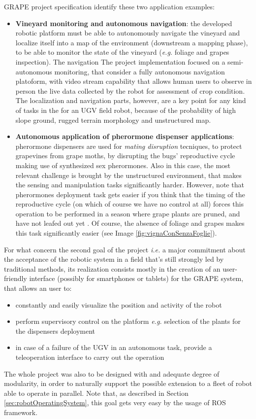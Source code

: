 \ac{GRAPE} project specification identify these two application examples:
\begin{itemize}
	\item \textbf{Vineyard monitoring and autonomous navigation}: the developed robotic platform must be able to autonomously navigate the vineyard and localize itself into a map of the environment (downstream a mapping phase), to be able to monitor the state of the vineyard (\textit{e.g.} foliage and grapes inspection). The navigation The project implementation focused on a semi-autonomous monitoring, that consider a fully autonomous navigation platoform, with video stream capability that allows human users to observe in person the live data collected by the robot for assessment of crop condition. The localization and navigation parts, however, are a key point for any kind of tasks in the for an \ac{UGV} field robot, because of the probability of high slope ground, rugged terrain morphology and unstructured map. 
	\item \textbf{Autonomous application of pherormone dispenser applications}: pherormone dispensers are used for \textit{mating disruption} tecniques, to protect grapevines from grape moths, by disrupting the bugs' reproductive cycle making use of synthesized sex pherormones. Also in this case, the most relevant challenge is brought by the unstructured environment, that makes the sensing and manipulation tasks significantly harder.  However, note that pherormones deployment task gets easier if you think that the timing of the reproductive cycle (on which of course we have no control at all) forces this operation to be performed in a season where grape plants are pruned, and have not leafed out yet \parencite{mateDisruptionEfficiency}. Of course, the absence of foliage and grapes makes this task significantly easier (see Image \ref{fig:vignaConSenzaFoglie}).
\end{itemize}

For what concern the second goal of the project \textit{i.e.} a major commitment about the acceptance of the robotic system in a field that's still strongly led by traditional methods, its realization consists mostly in the creation of an user-friendly interface (possibly for smartphones or tablets) for the \ac{GRAPE} system, that allows an user to:
\begin{itemize}
	\item constantly and easily visualize the position and activity of the robot 
	\item perform supervisory control on the platform \textit{e.g.} selection of the plants for the dispensers deployment
	\item in case of a failure of the \ac{UGV} in an autonomous task, provide a teleoperation interface to carry out the operation
\end{itemize}
The whole project was also to be designed with and adequate degree of modularity, in order to naturally support the possible extension to a fleet of robot able to operate in parallel. Note that, as described in Section \ref{sec:robotOperatingSystem}, this goal gets very easy by the usage of \ac{ROS} framework.

